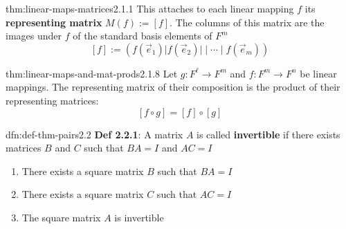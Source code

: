 \documentclass[landscape, 8pt]{extarticle}
\DeclareMathOperator{\Mat}{Mat}
\begin{document}
\begin{multicols}{3}
\begin{thm}{thm:linear-maps-matrices}{2.1.1}
    This attaches to each linear mapping $f$ its \textbf{representing matrix} $M(f) := [f]$. The columns of this matrix are the images under $f$ of the standard basis elements of $F^{m}$
    \[[f] := (f(\vec{e}_{1}) \lvert f(\vec{e}_{2}) \rvert \mid \cdots \mid f(\vec{e}_{m}))\]
\end{thm}



\begin{thm}{thm:linear-maps-and-mat-prods}{2.1.8}
    Let $g : F^{\ell}\to F^{m}$ and $f : F^{m} \to F^{n}$ be linear mappings. The representing matrix of their composition is the product of their representing matrices:
    \[[f \circ g] = [f] \circ [g]\]
    
\end{thm}



\begin{dfn}{dfn:def-thm-pairs}{2.2}
    \textbf{Def 2.2.1}: A matrix $A$ is called \textbf{invertible} if there exists matrices $B$ and $C$ such that $BA = I$ and $AC = I$
    \begin{enumerate}
        \setlength\itemsep{0em}
        \item There exists a square matrix $B$ such that $BA = I$
        \item There exists a square matrix $C$ such that $AC = I$
        \item The square matrix $A$ is invertible
    \end{enumerate}


\end{dfn}
\end{multicols}
\end{document}
